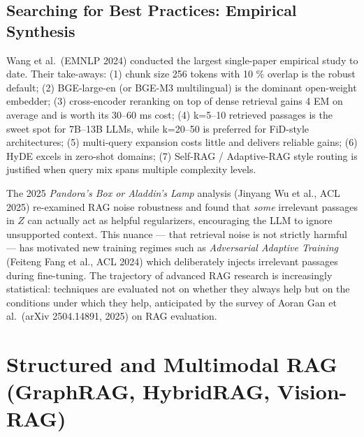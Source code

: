 \documentclass{article}
\begin{document}
\subsection{Searching for Best Practices: Empirical Synthesis}\label{searching-for-best-practices-empirical-synthesis}

Wang et al.~(EMNLP 2024) conducted the largest single-paper empirical study to date. Their take-aways: (1) chunk size 256 tokens with 10 \% overlap is the robust default; (2) BGE-large-en (or BGE-M3 multilingual) is the dominant open-weight embedder; (3) cross-encoder reranking on top of dense retrieval gains 4 EM on average and is worth its 30--60 ms cost; (4) k=5--10 retrieved passages is the sweet spot for 7B--13B LLMs, while k=20--50 is preferred for FiD-style architectures; (5) multi-query expansion costs little and delivers reliable gains; (6) HyDE excels in zero-shot domains; (7) Self-RAG / Adaptive-RAG style routing is justified when query mix spans multiple complexity levels.

The 2025 \emph{Pandora's Box or Aladdin's Lamp} analysis (Jinyang Wu et al., ACL 2025) re-examined RAG noise robustness and found that \emph{some} irrelevant passages in \(Z\) can actually act as helpful regularizers, encouraging the LLM to ignore unsupported context. This nuance --- that retrieval noise is not strictly harmful --- has motivated new training regimes such as \emph{Adversarial Adaptive Training} (Feiteng Fang et al., ACL 2024) which deliberately injects irrelevant passages during fine-tuning. The trajectory of advanced RAG research is increasingly statistical: techniques are evaluated not on whether they always help but on the conditions under which they help, anticipated by the survey of Aoran Gan et al.~(arXiv 2504.14891, 2025) on RAG evaluation.

\section{Structured and Multimodal RAG (GraphRAG, HybridRAG, Vision-RAG)}\label{structured-and-multimodal-rag-graphrag-hybridrag-vision-rag}
\end{document}
